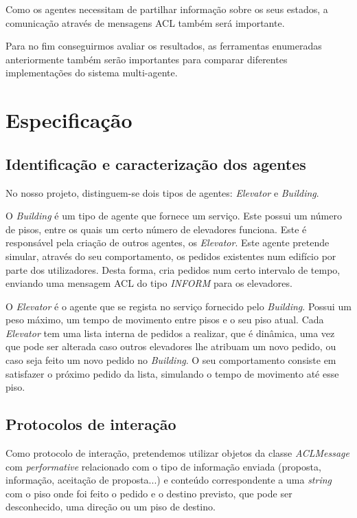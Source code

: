 \documentclass[a4paper]{article}
\begin{document}
Como os agentes necessitam de partilhar informação sobre os seus estados, a comunicação através de mensagens ACL também será importante.

Para no fim conseguirmos avaliar os resultados, as ferramentas enumeradas anteriormente também serão importantes para comparar diferentes implementações do sistema multi-agente.

\newpage

\section{Especificação}

\subsection{Identificação e caracterização dos agentes} 

No nosso projeto, distinguem-se dois tipos de agentes: \textit{Elevator} e \textit{Building}.

O \textit{Building} é um tipo de agente que fornece um serviço. Este possui um número de pisos, entre os quais um certo número de elevadores funciona. Este é responsável pela criação de outros agentes, os \textit{Elevator}. Este agente pretende simular, através do seu comportamento, os pedidos existentes num edifício por parte dos utilizadores. Desta forma, cria pedidos num certo intervalo de tempo, enviando uma mensagem ACL do tipo \textit{INFORM} para os elevadores.

O \textit{Elevator} é o agente que se regista no serviço fornecido pelo \textit{Building}. Possui um peso máximo, um tempo de movimento entre pisos e o seu piso atual. Cada \textit{Elevator} tem uma lista interna de pedidos a realizar, que é dinâmica, uma vez que pode ser alterada caso outros elevadores lhe atribuam um novo pedido, ou caso seja feito um novo pedido no \textit{Building}. O seu comportamento consiste em satisfazer o próximo pedido da lista, simulando o tempo de movimento até esse piso.

\subsection{Protocolos de interação} 

Como protocolo de interação, pretendemos utilizar objetos da classe \textit{ACLMessage} com \textit{performative} relacionado com o tipo de informação enviada (proposta, informação, aceitação de proposta...) e conteúdo correspondente a uma \textit{string} com o piso onde foi feito o pedido e o destino previsto, que pode ser desconhecido, uma direção ou um piso de destino.
\end{document}
